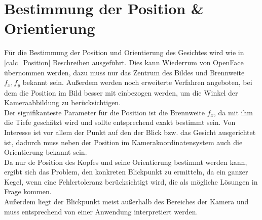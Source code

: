 \section{Bestimmung der Position \& Orientierung}
\label{bestimmung_Pos}
Für die Bestimmung der Position und Orientierung des Gesichtes wird wie in \ref{calc_Position} Beschreiben ausgeführt. Dies kann Wiederrum von OpenFace übernommen werden, dazu muss nur das Zentrum des Bildes und Brennweite $f_x,f_y$ bekannt sein. Außerdem werden noch erweiterte Verfahren angeboten, bei dem die Position im Bild besser mit einbezogen werden, um die Winkel der Kameraabbildung zu berücksichtigen.\\
Der signifikanteste Parameter für die Position ist die Brennweite $f_x$, da mit ihm die Tiefe geschätzt wird und sollte entsprechend exakt bestimmt sein. Von Interesse ist vor allem der Punkt auf den der Blick bzw. das Gesicht ausgerichtet ist, dadurch muss neben der Position im Kamerakoordinatensystem auch die Orientierung bekannt sein.\\
Da nur de Position des Kopfes und seine Orientierung bestimmt werden kann, ergibt sich das Problem, den konkreten Blickpunkt zu ermitteln, da ein ganzer Kegel, wenn eine Fehlertoleranz berücksichtigt wird, die als mögliche Lösungen in Frage kommen.\\
Außerdem liegt der Blickpunkt meist außerhalb des Bereiches der Kamera und muss entsprechend von einer Anwendung interpretiert werden.